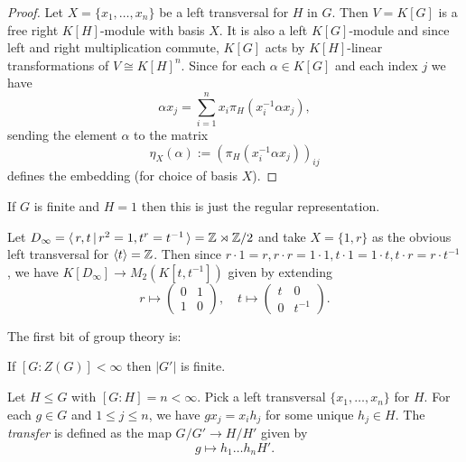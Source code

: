 \begin{proof}
    Let $X = \{x_1, \dots, x_n\}$ be a left transversal for $H$ in $G$.
    Then $V = K[G]$ is a free right $K[H]$-module with basis $X$.
    It is also a left $K[G]$-module and since left and right multiplication commute, $K[G]$ acts by $K[H]$-linear transformations of $V \cong K[H]^n$.
    Since for each $\alpha \in K[G]$ and each index $j$ we have \[
        \alpha x_j = \sum_{i=1}^n x_i \pi_H(x_i^{-1} \alpha x_j),
    \] sending the element $\alpha$ to the matrix \[
        \eta_X(\alpha) := \left( \pi_H(x_i^{-1} \alpha x_j) \right)_{ij}
    \] defines the embedding (for choice of basis $X$).

\end{proof}

\begin{remark}
    If $G$ is finite and $H = 1$ then this is just the regular representation.
\end{remark}

\begin{example}
    Let $D_\infty = \langle \, r, t \, | \, r^2 = 1, t^r = t^{-1} \, \rangle = \mathbb{Z} \rtimes \mathbb{Z}/2$ and take $X = \{1, r\}$ as the obvious left transversal for $\langle t \rangle = \mathbb{Z}$.
    Then since $r \cdot 1 = r, r \cdot r = 1 \cdot 1, t \cdot 1 = 1 \cdot t, t \cdot r = r \cdot t^{-1}$, we have $K[D_\infty] \to M_2(K[t, t^{-1}])$ given by extending \[
        r \mapsto \begin{pmatrix} 0 & 1 \\ 1 & 0 \end{pmatrix},
        \quad
        t \mapsto \begin{pmatrix} t & 0 \\ 0 & t^{-1} \end{pmatrix}.
    \]
\end{example}

The first bit of group theory is:

\begin{lemma}[Schur]
    If $[G : Z(G)] < \infty$ then $|G'|$ is finite.
\end{lemma}

\begin{definition}
    Let $H \leq G$ with $[G : H] = n < \infty$.
    Pick a left transversal $\{x_1, \dots, x_n\}$ for $H$.
    For each $g \in G$ and $1 \leq j \leq n$, we have $g x_j = x_i h_j$ for some unique $h_j \in H$.
    The \emph{transfer} is defined as the map $G / G' \to H / H'$ given by \[
        g \mapsto h_1 \dots h_n H'.
    \]
\end{definition}

